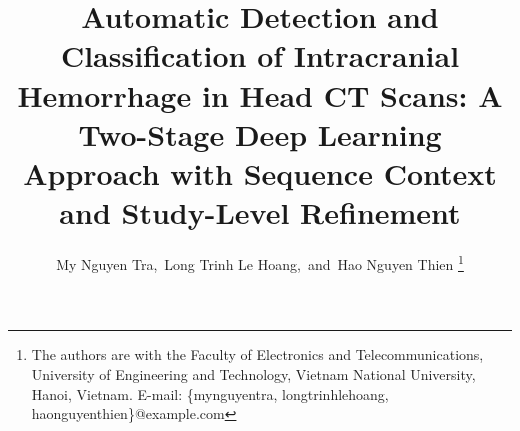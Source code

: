 \documentclass[conference]{IEEEtran}
\def\papertitle{%
  Automatic Detection and Classification of Intracranial Hemorrhage in
  Head CT Scans: A Two-Stage Deep Learning Approach with Sequence Context
  and Study-Level Refinement}
\begin{document}
\title{\papertitle}

\author{
    My Nguyen Tra,~Long Trinh Le Hoang,~and~Hao Nguyen Thien%
    \thanks{The authors are with the Faculty of Electronics and
    Telecommunications, University of Engineering and Technology,
    Vietnam National University, Hanoi, Vietnam.
    E-mail: \{mynguyentra, longtrinhlehoang, haonguyenthien\}@example.com}
}

\IEEEoverridecommandlockouts
\maketitle














\end{document}
